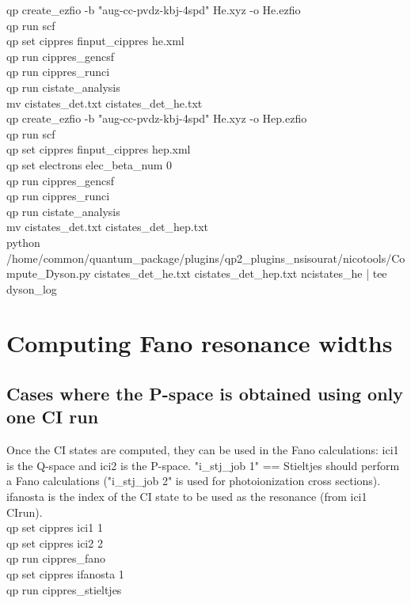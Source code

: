 \documentclass[a4paper, 10 pt]{report}
\begin{document}
\noindent qp create\_ezfio -b "aug-cc-pvdz-kbj-4spd" He.xyz -o He.ezfio\\
qp run scf\\
qp set cippres finput\_cippres he.xml\\
qp run cippres\_gencsf\\
qp run cippres\_runci\\
qp run cistate\_analysis\\
mv cistates\_det.txt cistates\_det\_he.txt\\
qp create\_ezfio -b "aug-cc-pvdz-kbj-4spd" He.xyz -o Hep.ezfio\\
qp run scf\\
qp set cippres finput\_cippres hep.xml\\
qp set electrons elec\_beta\_num 0\\
qp run cippres\_gencsf\\
qp run cippres\_runci\\
qp run cistate\_analysis\\
mv cistates\_det.txt cistates\_det\_hep.txt\\
python /home/common/quantum\_package/plugins/qp2\_plugins\_nsisourat/nicotools/Compute\_Dyson.py cistates\_det\_he.txt cistates\_det\_hep.txt ncistates\_he | tee dyson\_log\\

\section{Computing Fano resonance widths}

\subsection{Cases where the P-space is obtained using only one CI run}

Once the CI states are computed, they can be used in the Fano calculations: ici1 is the Q-space and ici2 is the P-space.  "i\_stj\_job 1" == Stieltjes should perform a Fano calculations ("i\_stj\_job 2" is used for photoionization cross sections). ifanosta is the index of the CI state to be used as the resonance (from ici1 CIrun).\\

\noindent qp set cippres ici1 1\\
qp set cippres ici2 2\\
qp run cippres\_fano\\
qp set cippres ifanosta 1  \\
qp run cippres\_stieltjes  \\
\end{document}
